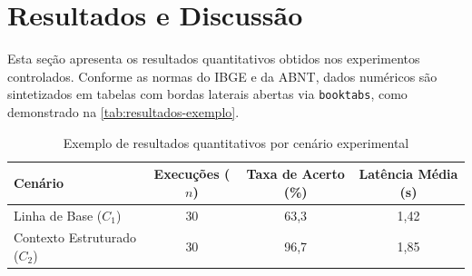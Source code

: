 \chapter{Resultados e Discussão}

Esta seção apresenta os resultados quantitativos obtidos nos experimentos controlados. Conforme as normas do IBGE e da ABNT, dados numéricos são sintetizados em tabelas com bordas laterais abertas via \texttt{booktabs}, como demonstrado na \autoref{tab:resultados-exemplo}.

\begin{table}[!htbp]
    \centering
    \caption{Exemplo de resultados quantitativos por cenário experimental}
    \small
    \begin{tabular}{lccc}
        \toprule
        \textbf{Cenário} & \textbf{Execuções ($n$)} & \textbf{Taxa de Acerto (\%)} & \textbf{Latência Média (s)} \\
        \midrule
        Linha de Base ($C_1$) & 30 & 63,3 & 1,42 \\
        Contexto Estruturado ($C_2$) & 30 & 96,7 & 1,85 \\
        \bottomrule
    \end{tabular}
    \label{tab:resultados-exemplo}
\end{table}
